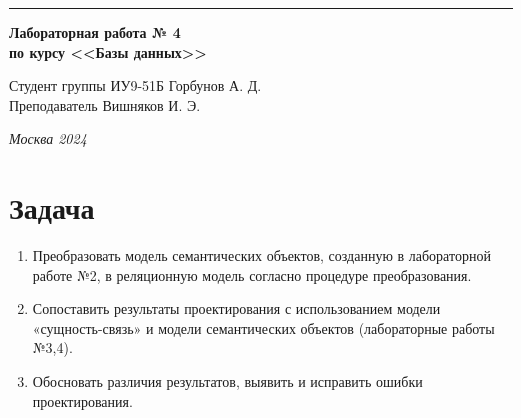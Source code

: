 \documentclass[a4paper, 14pt]{extarticle}
\begin{document}
\begin{titlepage}
\vspace*{-16pt}
\hspace{30pt}\rule{0.866\textwidth}{0.4pt}
  
\vspace{11em}

\begin{center}
\Large {\bf Лабораторная работа № 4} \\ 
\large {\bf по курсу <<Базы данных>>}\\
\end{center}\normalsize

\vspace{8em}


\begin{flushright}
  {Студент группы ИУ9-51Б Горбунов А. Д.\hspace*{15pt} \\
  \vspace{2ex}
  Преподаватель Вишняков И. Э.\hspace*{15pt}}
\end{flushright}

\bigskip

\vfill
 

\begin{center}
\textsl{Москва 2024}
\end{center}
\end{titlepage}

\renewcommand{\ttdefault}{pcr}

\setlength{\tabcolsep}{3pt}
\newpage
\setcounter{page}{2}

\section{Задача}\label{Sect::task}
\par

\begin{enumerate}
    \item Преобразовать модель семантических объектов, созданную в лабораторной работе №2, в реляционную модель согласно процедуре преобразования.
    \item Сопоставить результаты проектирования с использованием модели «сущность-связь» и модели семантических объектов (лабораторные работы №3,4).
    \item Обосновать различия результатов, выявить и исправить ошибки проектирования.
\end{enumerate}
\end{document}
